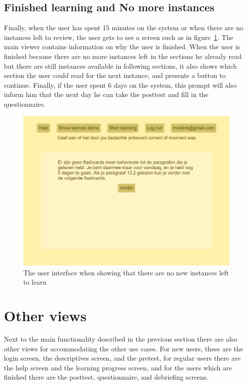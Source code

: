 \subsection{Finished learning and No more instances}

Finally, when the user has spent 15 minutes on the system or when there are no instances left to review, the user gets to see a screen such as in figure~\ref{fig:ui_no_more_instances}. The main viewer contains information on why the user is finished. When the user is finished because there are no more instances left in the sections he already read but there are still instances available in following sections, it also shows which section the user could read for the next instance, and presents a button to continue. Finally, if the user spent 6 days on the system, this prompt will also inform him that the next day he can take the posttest and fill in the questionnaire.

\begin{figure}
    \centering
    \includegraphics[width=.8\textwidth]{img/ui_no_more_instances.png}
    \caption{The user interface when showing that there are no new instances left to learn}
    \label{fig:ui_no_more_instances}
\end{figure}

\section{Other views}

Next to the main functionality described in the previous section there are also other views for accommodating the other use cases. For new users, these are the login screen, the descriptives screen, and the pretest, for regular users there are the help screen and the learning progress screen, and for the users which are finished there are the posttest, questionnaire, and debriefing screens.

